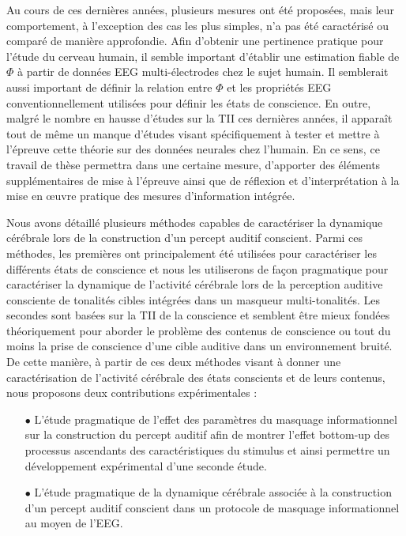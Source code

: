 Au cours de ces dernières années, plusieurs mesures ont été proposées, mais leur comportement, à l'exception des cas les plus simples, n'a pas été caractérisé ou comparé de manière approfondie. 
Afin d'obtenir une pertinence pratique pour l'étude du cerveau humain, il semble important d'établir une estimation fiable de $\Phi$ à partir de données EEG multi-électrodes chez le sujet humain. 
Il semblerait aussi important de définir la relation entre $\Phi$ et les propriétés EEG conventionnellement utilisées pour définir les états de conscience. 
En outre, malgré le nombre en hausse d'études sur la TII ces dernières années, il apparaît tout de même un manque d'études visant spécifiquement à tester et mettre à l'épreuve cette théorie sur des données neurales chez l'humain. 
En ce sens, ce travail de thèse permettra dans une certaine mesure, d'apporter des éléments supplémentaires de mise à l'épreuve ainsi que de réflexion et d'interprétation à la mise en œuvre pratique des mesures d'information intégrée. 

Nous avons détaillé plusieurs méthodes capables de caractériser la dynamique cérébrale lors de la construction d'un percept auditif conscient. 
Parmi ces méthodes, les premières ont principalement été utilisées pour caractériser les différents états de conscience et nous les utiliserons de façon pragmatique pour caractériser la dynamique de l'activité cérébrale lors de la perception auditive consciente de tonalités cibles intégrées dans un masqueur multi-tonalités. 
Les secondes sont basées sur la TII de la conscience et semblent être mieux fondées théoriquement pour aborder le problème des contenus de conscience ou tout du moins la prise de conscience d'une cible auditive dans un environnement bruité. \\

De cette manière, à partir de ces deux méthodes visant à donner une caractérisation de l'activité cérébrale des états conscients et de leurs contenus, nous proposons deux contributions expérimentales : 
\begin{itemize}
\item[$\bullet$] L'étude pragmatique de l'effet des paramètres du masquage informationnel sur la construction du percept auditif afin de montrer l'effet bottom-up des processus ascendants des caractéristiques du stimulus et ainsi permettre un développement expérimental d'une seconde étude. 
\item[$\bullet$] L'étude pragmatique de la dynamique cérébrale associée à la construction d'un percept auditif conscient dans un protocole de masquage informationnel au moyen de l'EEG. 
\end{itemize} 

\clearpage\null\newpage
